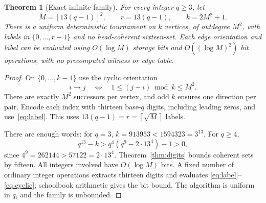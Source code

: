 \documentclass[11pt]{amsart}
\newtheorem{theorem}{Theorem}[section]
\theoremstyle{definition}
\theoremstyle{remark}
\newcommand{\ceil}[1]{\left\lceil#1\right\rceil}
\begin{document}
\begin{theorem}[Exact infinite family]\label{thm:generator}
For every integer $q\ge3$, let
\begin{equation}\label{eq:family}
 M=[13(q-1)]^2,\qquad r=13(q-1),\qquad k=2M^2+1.
\end{equation}
There is a uniform deterministic tournament on $k$ vertices, of outdegree
$M^2$, with labels in $\{0,\ldots,r-1\}$ and no head-coherent sixteen-set.
Each edge orientation and label
can be evaluated using $O(\log M)$ storage bits and
$O((\log M)^2)$ bit operations, with no precomputed witness or edge table.
\end{theorem}
\begin{proof}
On $\{0,\ldots,k-1\}$ use the cyclic orientation
\begin{equation}\label{eq:cyclic}
 i\to j\quad\Longleftrightarrow\quad
 1\le(j-i)\bmod k\le M^2.
\end{equation}
There are exactly $M^2$ successors per vertex, and odd $k$ ensures one
direction per pair. Encode each index with thirteen base-$q$ digits,
including leading zeros, and use~\eqref{eq:label}. This uses
$13(q-1)=r=\ceil{\sqrt M}$ labels.

There are enough words: for $q=3$,
$k=913953<1594323=3^{13}$. For $q\ge4$,
\[
 q^{13}-k>q^4(q^9-2\cdot13^4)-1>0,
\]
since $4^9=262144>57122=2\cdot13^4$.
Theorem~\ref{thm:digits} bounds coherent sets by fifteen.
All integers involved have $O(\log M)$ bits. A fixed number of ordinary
integer operations extracts thirteen digits and evaluates
\eqref{eq:label}--\eqref{eq:cyclic}; schoolbook arithmetic gives the bit
bound. The algorithm is uniform in $q$, and the family is unbounded.
\end{proof}
\end{document}
